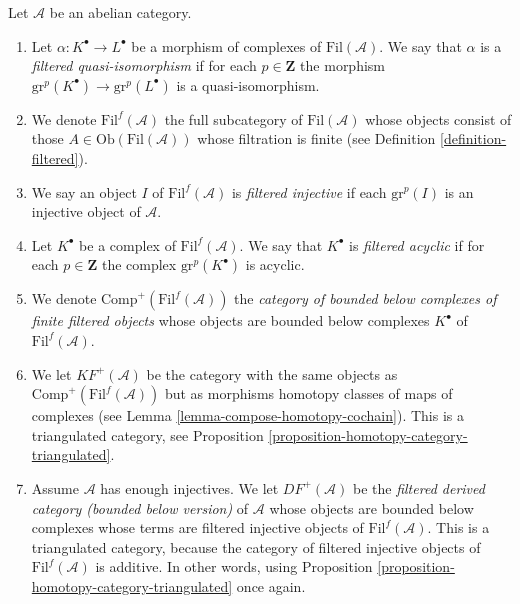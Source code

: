 \begin{definition}
\label{definition-filtered-complexes-notation}
Let $\mathcal{A}$ be an abelian category.
\begin{enumerate}
\item Let $\alpha : K^\bullet \to L^\bullet$ be a morphism of
complexes of $\text{Fil}(\mathcal{A})$. We say that
$\alpha$ is a {\it filtered quasi-isomorphism} if
for each $p \in \mathbf{Z}$ the morphism
$\text{gr}^p(K^\bullet) \to \text{gr}^p(L^\bullet)$ is
a quasi-isomorphism.
\item We denote $\text{Fil}^f(\mathcal{A})$ the full subcategory
of $\text{Fil}(\mathcal{A})$ whose objects consist of
those $A \in \text{Ob}(\text{Fil}(\mathcal{A}))$
whose filtration is finite (see Definition \ref{definition-filtered}).
\item We say an object $I$ of $\text{Fil}^f(\mathcal{A})$
is {\it filtered injective} if each $\text{gr}^p(I)$ is
an injective object of $\mathcal{A}$.
\item Let $K^\bullet$ be a complex of $\text{Fil}^f(\mathcal{A})$.
We say that $K^\bullet$ is {\it filtered acyclic} if
for each $p \in \mathbf{Z}$ the complex $\text{gr}^p(K^\bullet)$ is
acyclic.
\item We denote $\text{Comp}^{+}(\text{Fil}^f(\mathcal{A}))$ the
{\it category of bounded below complexes of finite filtered objects}
whose objects are bounded below complexes
$K^\bullet$ of $\text{Fil}^f(\mathcal{A})$.
\item We let $KF^{+}(\mathcal{A})$ be the category with the same objects
as $\text{Comp}^{+}(\text{Fil}^f(\mathcal{A}))$
but as morphisms homotopy classes of
maps of complexes (see Lemma \ref{lemma-compose-homotopy-cochain}).
This is a triangulated category, see
Proposition \ref{proposition-homotopy-category-triangulated}.
\item Assume $\mathcal{A}$ has enough injectives.
We let $DF^{+}(\mathcal{A})$ be the
{\it filtered derived category (bounded below version)}
of $\mathcal{A}$ whose objects are bounded below complexes
whose terms are filtered injective objects of $\text{Fil}^f(\mathcal{A})$.
This is a triangulated category, because the category of filtered
injective objects of $\text{Fil}^f(\mathcal{A})$ is additive.
In other words, using
Proposition \ref{proposition-homotopy-category-triangulated}
once again.
\end{enumerate}
\end{definition}


